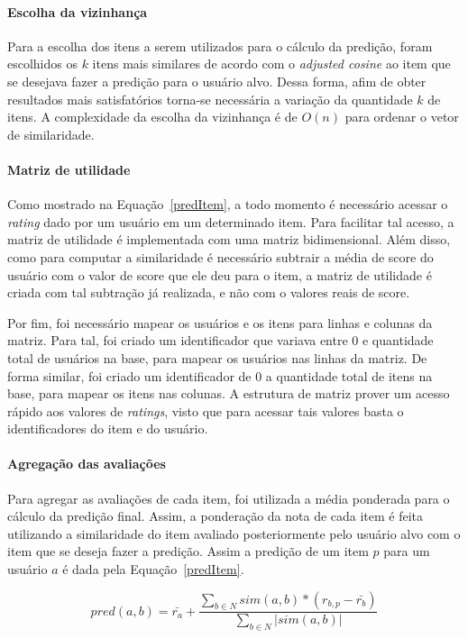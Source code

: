 \documentclass[brazil,a4paper,11pt]{article}
\begin{document}
\paragraph{Escolha da vizinhança} Para a escolha dos itens a serem utilizados para o cálculo da predição, foram escolhidos os $k$ itens mais similares de acordo com o \textit{adjusted cosine} ao item que se desejava fazer a predição para o usuário alvo. Dessa forma, afim de obter resultados mais satisfatórios torna-se necessária a variação da quantidade $k$ de itens. A complexidade da escolha da vizinhança é de $O(n)$ para ordenar o vetor de similaridade.

\paragraph{Matriz de utilidade} Como mostrado na Equação~\ref{predItem}, a todo momento é necessário acessar o \textit{rating} dado por um usuário em um determinado item. Para facilitar tal acesso, a matriz de utilidade é implementada com uma matriz bidimensional. Além disso, como para computar a similaridade é necessário subtrair a média de score do usuário com o valor de score que ele deu para o item, a matriz de utilidade é criada com tal subtração já realizada, e não com o valores reais de score. 

Por fim, foi necessário mapear os usuários e os itens para linhas e colunas da matriz. Para tal, foi criado um identificador que variava entre 0 e quantidade total de usuários na base, para mapear os usuários nas linhas da matriz. De forma similar, foi criado um identificador de 0 a quantidade total de itens na base, para mapear os itens nas colunas. A estrutura de matriz prover um acesso rápido aos valores de \textit{ratings}, visto que para acessar tais valores basta o identificadores do item e do usuário.

\paragraph{Agregação das avaliações}  Para agregar as avaliações de cada item, foi utilizada a média ponderada para o cálculo da predição final. Assim, a ponderação da nota de cada item é feita utilizando a similaridade do item avaliado posteriormente pelo usuário alvo com o item que se deseja fazer a predição. Assim a predição de um item $p$ para um usuário $a$ é dada pela Equação~\ref{predItem}.

\begin{equation}
\label{predItem}
pred(a,b) = \bar{r_a} + \frac{\sum_{b\in N} sim(a,b) * (r_{b,p} - \bar{r_b})}{\sum_{b \in N} |sim(a,b)|}
\end{equation}
\end{document}
